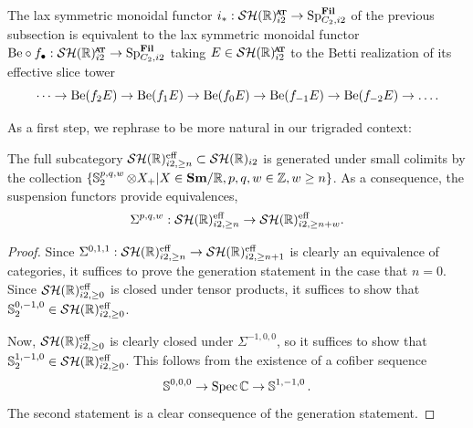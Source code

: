 \begin{prop} \label{thm:eff-fil}
  The lax symmetric monoidal functor $i_* : \SHRat \to \Sp_{C_2, i2}^{\Fil}$ of the previous subsection is equivalent to the lax symmetric monoidal functor $\b \circ f_\bullet : \SHRat \to \Sp_{C_2, i2}^{\Fil}$ taking $E \in \SHRat$ to the Betti realization of its effective slice tower
  \[\dots \to \mathrm{Be} (f_{2} E) \to \mathrm{Be} (f_1 E) \to \mathrm{Be} (f_0 E) \to \mathrm{Be} (f_{-1} E) \to \mathrm{Be} (f_{-2} E) \to \dots.\]
\end{prop}
%
%
%

As a first step, we rephrase  to be more natural in our trigraded context:

\begin{lem}
  The full subcategory $\mathcal{SH}(\mathbb{R})^{\mathrm{eff}} _{i2, \geq n} \subset \mathcal{SH}(\mathbb{R})_{i2}$ is generated under small colimits by the collection $\{\operatorname{\mathbb{S}}_2 ^{p,q,w} \otimes X_+ \vert X \in \textbf{Sm} / \mathbb{R}, p,q,w \in \mathbb{Z}, w \geq n\}$.
  As a consequence, the suspension functors provide equivalences,
  \[ \Sigma^{p,q,w} : \mathcal{SH}(\mathbb{R})^{\mathrm{eff}} _{i2, \geq n} \to \mathcal{SH}(\mathbb{R})^{\mathrm{eff}} _{i2, \geq n+w}. \]
\end{lem}

\begin{proof}
  Since $\Sigma^{0,1,1} : \mathcal{SH}(\mathbb{R})^{\mathrm{eff}} _{i2, \geq n} \to \mathcal{SH}(\mathbb{R})^{\mathrm{eff}} _{i2, \geq n+1}$ is clearly an equivalence of categories, it suffices to prove the generation statement in the case that $n = 0$.
  Since $\mathcal{SH}(\mathbb{R})^{\mathrm{eff}} _{i2, \geq 0}$ is closed under tensor products, it suffices to show that $\operatorname{\mathbb{S}}_2^{0,-1,0} \in \mathcal{SH}(\mathbb{R})^{\mathrm{eff}} _{i2, \geq 0}$.

  Now, $\mathcal{SH}(\mathbb{R})^{\mathrm{eff}} _{i2, \geq 0}$ is clearly closed under $\Sigma^{-1,0,0}$, so it suffices to show that $\operatorname{\mathbb{S}}_2 ^{1,-1,0} \in \mathcal{SH}(\mathbb{R})^{\mathrm{eff}} _{i2, \geq 0}$.
  This follows from the existence of a cofiber sequence
  \[ \operatorname{\mathbb{S}}^{0,0,0} \to \operatorname{\mathrm{Spec}} \mathbb{C} \to \operatorname{\mathbb{S}}^{1,-1,0}. \]
  The second statement is a clear consequence of the generation statement.
\end{proof}

